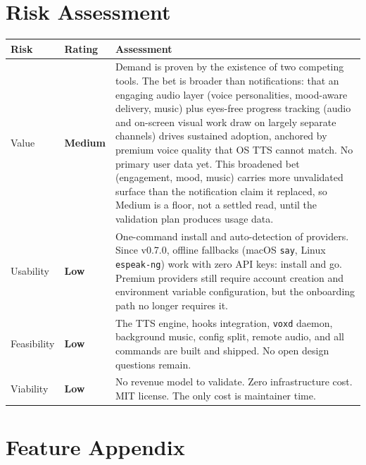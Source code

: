 \documentclass[11pt,letterpaper]{article}
\begin{document}
\newpage
\section*{Risk Assessment}

\renewcommand{\arraystretch}{1.6}
\begin{tabularx}{\textwidth}{@{} l l X @{}}
\toprule
\textbf{\color{SectionBlue}Risk} & \textbf{\color{SectionBlue}Rating} & \textbf{\color{SectionBlue}Assessment} \\
\midrule
Value      & \textcolor{RiskAmber}{\textbf{Medium}} &
  Demand is proven by the existence of two competing tools. The bet is broader
  than notifications: that an engaging audio layer (voice personalities,
  mood-aware delivery, music) plus eyes-free progress tracking (audio and
  on-screen visual work draw on largely separate channels) drives sustained
  adoption, anchored by premium voice quality that OS TTS cannot match. No
  primary user data yet. This broadened bet (engagement, mood, music)
  carries more unvalidated surface than the notification claim it replaced, so
  Medium is a floor, not a settled read, until the validation plan produces
  usage data. \\
Usability  & \textcolor{RiskGreen}{\textbf{Low}} &
  One-command install and auto-detection of providers. Since v0.7.0, offline
  fallbacks (macOS \texttt{say}, Linux \texttt{espeak-ng}) work with zero
  API keys: install and go. Premium providers still require account
  creation and environment variable configuration, but the onboarding path
  no longer requires it. \\
Feasibility & \textcolor{RiskGreen}{\textbf{Low}} &
  The TTS engine, hooks integration, \texttt{voxd} daemon, background music,
  config split, remote audio, and all commands are built and shipped.
  No open design questions remain. \\
Viability  & \textcolor{RiskGreen}{\textbf{Low}} &
  No revenue model to validate. Zero infrastructure cost. MIT license.
  The only cost is maintainer time. \\
\bottomrule
\end{tabularx}
\renewcommand{\arraystretch}{1.0}


\newpage
\section*{Feature Appendix}
\end{document}
